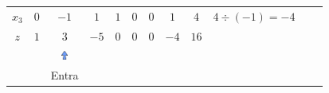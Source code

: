 \begin{frame}
{\begin{table}
\begin{tabular}{c c c c c c c c c c c c}
				\cellcolor{blue!80} \color{red} $ \scriptstyle x_3$
				& \cellcolor{yellow!60}  $ \scriptstyle 0$
				& \cellcolor{gray!60}  $ \scriptstyle -1$ 
				& \cellcolor{yellow!60}  $ \scriptstyle 1$
				& \cellcolor{yellow!60}  $ \scriptstyle 1$
				& \cellcolor{yellow!60}  $ \scriptstyle 0$
				& \cellcolor{yellow!60}  $ \scriptstyle 0$
				& \cellcolor{yellow!60}  $ \scriptstyle 1$ 
				& \cellcolor{gray!60}  $ \scriptstyle 4$ 
				& $ \scriptstyle 4 \div (-1) = -4 $ \\
				\cellcolor{blue!80} \color{white} $ \scriptstyle z$
				& \cellcolor{yellow!60}  $ \scriptstyle 1$
				& \cellcolor{gray!60}  $ \scriptstyle 3$ 
				& \cellcolor{yellow!60}  $ \scriptstyle -5$
				& \cellcolor{yellow!60}  $ \scriptstyle 0$
				& \cellcolor{yellow!60}  $ \scriptstyle 0$
				& \cellcolor{yellow!60}  $ \scriptstyle 0$
				& \cellcolor{yellow!60}  $ \scriptstyle -4$ 
				& \cellcolor{gray!60}  $ \scriptstyle 16$ \\
				
				& 
				&  \includegraphics[width=0.3cm,height=0.3cm]{setacima.jpg}
				& 
				& 
				& 
				& 
				&  
				&  
				& & & \\
				
				& 
				&  \scriptsize Entra 
				& 
				& 
				& 
				& 
				&  
				&  
				& & & \\
				

\end{tabular}
\end{table}}
\end{frame}
